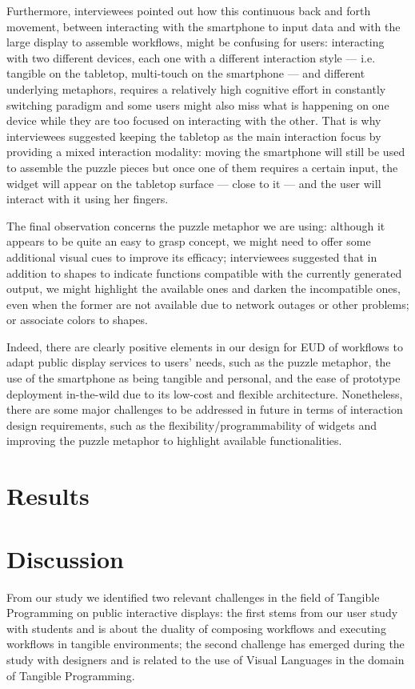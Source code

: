 Furthermore, interviewees pointed out how this continuous back and forth movement, between interacting with the smartphone to input data and with the large display to assemble workflows, might be confusing for users: interacting with two different devices, each one with a different interaction style --- i.e. tangible on the tabletop, multi-touch on the smartphone --- and different underlying metaphors, requires a relatively high cognitive effort in constantly switching paradigm and some users might also miss what is happening on one device while they are too focused on interacting with the other. That is why interviewees suggested keeping the tabletop as the main interaction focus by providing a mixed interaction modality: moving the smartphone will still be used to assemble the puzzle pieces but once one of them requires a certain input, the widget will appear on the tabletop surface --- close to it --- and the user will interact with it using her fingers.

The final observation concerns the puzzle metaphor we are using: although it appears to be quite an easy to grasp concept, we might need to offer some additional visual cues to improve its efficacy; interviewees suggested that in addition to shapes to indicate functions compatible with the currently generated output, we might highlight the available ones and darken the incompatible ones, even when the former are not available due to network outages or other problems; or associate colors to shapes.

Indeed, there are clearly positive elements in our design for \ac{EUD} of workflows to adapt public display services to users' needs, such as the puzzle metaphor, the use of the smartphone as being tangible and personal, and the ease of prototype deployment in-the-wild due to its low-cost and flexible architecture. Nonetheless, there are some major challenges to be addressed in future in terms of interaction design requirements, such as the flexibility/programmability of widgets and improving the puzzle metaphor to highlight available functionalities.

\section{Results}

\section{Discussion}
From our study we identified two relevant challenges in the field of Tangible Programming on public interactive displays: the first stems from our user study with students and is about the duality of composing workflows and executing workflows in tangible environments; the second challenge has emerged during the study with designers and is related to the use of Visual Languages in the domain of Tangible Programming. 

